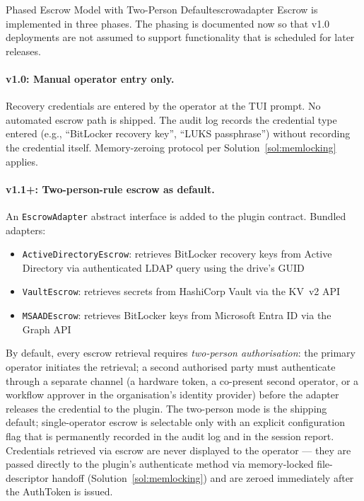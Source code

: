 \documentclass[11pt,a4paper]{report}
\begin{document}
\begin{solution}{Phased Escrow Model with Two-Person Default}{escrowadapter}
\label{sec:escrow:solution}
Escrow is implemented in three phases. The phasing is documented now so that v1.0 deployments are not assumed to support functionality that is scheduled for later releases.

\paragraph{v1.0: Manual operator entry only.}
Recovery credentials are entered by the operator at the TUI prompt. No automated escrow path is shipped. The audit log records the credential type entered (e.g., ``BitLocker recovery key'', ``LUKS passphrase'') without recording the credential itself. Memory-zeroing protocol per Solution~\ref{sol:memlocking} applies.

\paragraph{v1.1+: Two-person-rule escrow as default.}
An \texttt{EscrowAdapter} abstract interface is added to the plugin contract. Bundled adapters:

\begin{itemize}[noitemsep]
  \item \texttt{ActiveDirectoryEscrow}: retrieves BitLocker recovery keys from Active Directory via authenticated LDAP query using the drive's GUID
  \item \texttt{VaultEscrow}: retrieves secrets from HashiCorp Vault via the KV~v2 API
  \item \texttt{MSAADEscrow}: retrieves BitLocker keys from Microsoft Entra ID via the Graph API
\end{itemize}

By default, every escrow retrieval requires \emph{two-person authorisation}: the primary operator initiates the retrieval; a second authorised party must authenticate through a separate channel (a hardware token, a co-present second operator, or a workflow approver in the organisation's identity provider) before the adapter releases the credential to the plugin. The two-person mode is the shipping default; single-operator escrow is selectable only with an explicit configuration flag that is permanently recorded in the audit log and in the session report. Credentials retrieved via escrow are never displayed to the operator --- they are passed directly to the plugin's authenticate method via memory-locked file-descriptor handoff (Solution~\ref{sol:memlocking}) and are zeroed immediately after the AuthToken is issued.


\end{solution}
\end{document}
